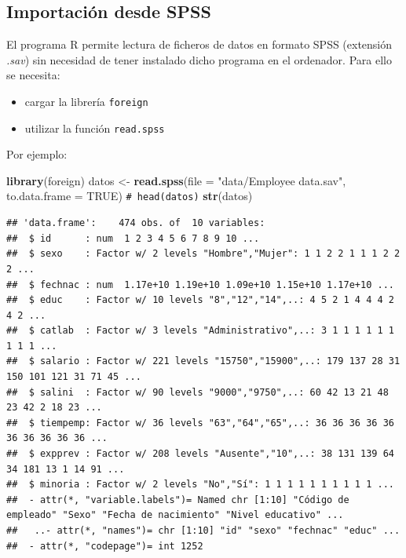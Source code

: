 \documentclass[
]{book}
\newenvironment{Shaded}{\begin{snugshade}}{\end{snugshade}}
\newcommand{\AttributeTok}[1]{\textcolor[rgb]{0.13,0.29,0.53}{#1}}
\newcommand{\CommentTok}[1]{\textcolor[rgb]{0.56,0.35,0.01}{\textit{#1}}}
\newcommand{\ConstantTok}[1]{\textcolor[rgb]{0.56,0.35,0.01}{#1}}
\newcommand{\FunctionTok}[1]{\textcolor[rgb]{0.13,0.29,0.53}{\textbf{#1}}}
\newcommand{\NormalTok}[1]{#1}
\newcommand{\OtherTok}[1]{\textcolor[rgb]{0.56,0.35,0.01}{#1}}
\newcommand{\StringTok}[1]{\textcolor[rgb]{0.31,0.60,0.02}{#1}}
\theoremstyle{break}
\theoremstyle{nonumberplain}
\renewcommand{\CommentTok}[1]{\textcolor[rgb]{0.41,0.41,0.41}{\texttt{#1}}}
\begin{document}
\subsection{Importación desde SPSS}\label{importaciuxf3n-desde-spss}

El programa R permite lectura de ficheros de datos en formato SPSS (extensión \emph{.sav}) sin necesidad de tener instalado dicho programa en el ordenador. Para ello se necesita:

\begin{itemize}
\item
  cargar la librería \texttt{foreign}
\item
  utilizar la función \texttt{read.spss}
\end{itemize}

Por ejemplo:

\small

\begin{Shaded}
\begin{Highlighting}[]
\FunctionTok{library}\NormalTok{(foreign)}
\NormalTok{datos }\OtherTok{\textless{}{-}} \FunctionTok{read.spss}\NormalTok{(}\AttributeTok{file =} \StringTok{"data/Employee data.sav"}\NormalTok{, }
                   \AttributeTok{to.data.frame =} \ConstantTok{TRUE}\NormalTok{)}
\CommentTok{\# head(datos)}
\FunctionTok{str}\NormalTok{(datos)}
\end{Highlighting}
\end{Shaded}

\begin{verbatim}
## 'data.frame':    474 obs. of  10 variables:
##  $ id      : num  1 2 3 4 5 6 7 8 9 10 ...
##  $ sexo    : Factor w/ 2 levels "Hombre","Mujer": 1 1 2 2 1 1 1 2 2 2 ...
##  $ fechnac : num  1.17e+10 1.19e+10 1.09e+10 1.15e+10 1.17e+10 ...
##  $ educ    : Factor w/ 10 levels "8","12","14",..: 4 5 2 1 4 4 4 2 4 2 ...
##  $ catlab  : Factor w/ 3 levels "Administrativo",..: 3 1 1 1 1 1 1 1 1 1 ...
##  $ salario : Factor w/ 221 levels "15750","15900",..: 179 137 28 31 150 101 121 31 71 45 ...
##  $ salini  : Factor w/ 90 levels "9000","9750",..: 60 42 13 21 48 23 42 2 18 23 ...
##  $ tiempemp: Factor w/ 36 levels "63","64","65",..: 36 36 36 36 36 36 36 36 36 36 ...
##  $ expprev : Factor w/ 208 levels "Ausente","10",..: 38 131 139 64 34 181 13 1 14 91 ...
##  $ minoria : Factor w/ 2 levels "No","Sí": 1 1 1 1 1 1 1 1 1 1 ...
##  - attr(*, "variable.labels")= Named chr [1:10] "Código de empleado" "Sexo" "Fecha de nacimiento" "Nivel educativo" ...
##   ..- attr(*, "names")= chr [1:10] "id" "sexo" "fechnac" "educ" ...
##  - attr(*, "codepage")= int 1252
\end{verbatim}
\end{document}

